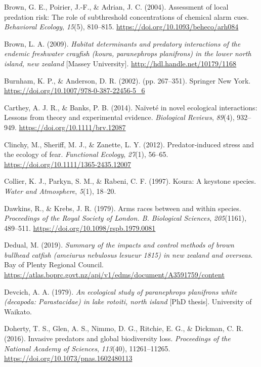 \documentclass[
  letterpaper,
  DIV=11,
  numbers=noendperiod]{scrartcl}
\newlength{\cslhangindent}
\newenvironment{CSLReferences}[2] %
 {\begin{list}{}{%
  \setlength{\itemindent}{0pt}
  \setlength{\leftmargin}{0pt}
  \setlength{\parsep}{0pt}
  \ifodd #1
   \setlength{\leftmargin}{\cslhangindent}
   \setlength{\itemindent}{-1\cslhangindent}
  \fi
  \setlength{\itemsep}{#2\baselineskip}}}
 {\end{list}}
\begin{document}
\begin{CSLReferences}{1}{0}
Brown, G. E., Poirier, J.-F., \& Adrian, J. C. (2004). Assessment of
local predation risk: The role of subthreshold concentrations of
chemical alarm cues. \emph{Behavioral Ecology}, \emph{15}(5), 810--815.
\url{https://doi.org/10.1093/beheco/arh084}

Brown, L. A. (2009). \emph{Habitat determinants and predatory
interactions of the endemic freshwater crayfish (koura, paranephrops
planifrons) in the lower north island, new zealand} {[}Massey
University{]}. \url{http://hdl.handle.net/10179/1168}

Burnham, K. P., \& Anderson, D. R. (2002). (pp. 267--351). Springer New
York. \url{https://doi.org/10.1007/978-0-387-22456-5_6}

Carthey, A. J. R., \& Banks, P. B. (2014). Naïveté in novel ecological
interactions: Lessons from theory and experimental evidence.
\emph{Biological Reviews}, \emph{89}(4), 932--949.
\url{https://doi.org/10.1111/brv.12087}

Clinchy, M., Sheriff, M. J., \& Zanette, L. Y. (2012). Predator‐induced
stress and the ecology of fear. \emph{Functional Ecology}, \emph{27}(1),
56--65. \url{https://doi.org/10.1111/1365-2435.12007}

Collier, K. J., Parkyn, S. M., \& Rabeni, C. F. (1997). Koura: A
keystone species. \emph{Water and Atmosphere}, \emph{5}(1), 18--20.

Dawkins, R., \& Krebs, J. R. (1979). Arms races between and within
species. \emph{Proceedings of the Royal Society of London. B. Biological
Sciences}, \emph{205}(1161), 489--511.
\url{https://doi.org/10.1098/rspb.1979.0081}

Dedual, M. (2019). \emph{Summary of the impacts and control methods of
brown bullhead catfish (ameiurus nebulosus lesueur 1815) in new zealand
and overseas}. Bay of Plenty Regional Council.
\url{https://atlas.boprc.govt.nz/api/v1/edms/document/A3591759/content}

Devcich, A. A. (1979). \emph{An ecological study of paranephrops
planifrons white (decapoda: Parastacidae) in lake rotoiti, north island}
{[}PhD thesis{]}. University of Waikato.

Doherty, T. S., Glen, A. S., Nimmo, D. G., Ritchie, E. G., \& Dickman,
C. R. (2016). Invasive predators and global biodiversity loss.
\emph{Proceedings of the National Academy of Sciences}, \emph{113}(40),
11261--11265. \url{https://doi.org/10.1073/pnas.1602480113}


\end{CSLReferences}
\end{document}
